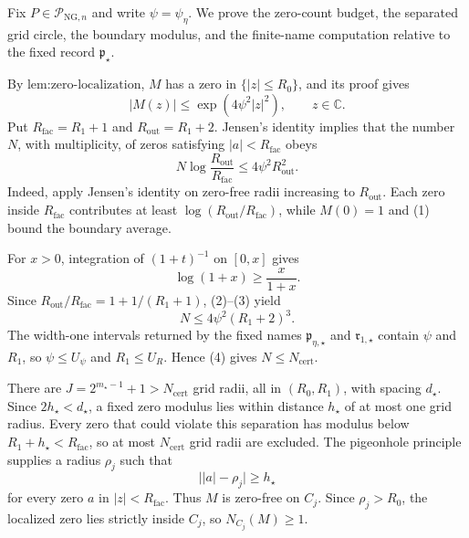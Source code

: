 Fix \(P\in\mathcal P_{\mathrm{NG},n}\) and write \(\psi=\psi_{\eta}\).  We prove the zero-count budget, the separated grid circle, the boundary modulus, and the finite-name computation relative to the fixed record \(\mathfrak p_{\star}\).

By \(\text{lem:zero-localization}\), \(M\) has a zero in \(\{|z|\le R_0\}\), and its proof gives
\[
 |M(z)|\le \exp(4\psi^2|z|^2),\qquad z\in\mathbb C. \tag{1}
\]
Put \(R_{\mathrm{fac}}=R_1+1\) and \(R_{\mathrm{out}}=R_1+2\).  Jensen's identity implies that the number \(N\), with multiplicity, of zeros satisfying \(|a|<R_{\mathrm{fac}}\) obeys
\[
 N\log\frac{R_{\mathrm{out}}}{R_{\mathrm{fac}}}
 \le4\psi^2R_{\mathrm{out}}^2. \tag{2}
\]
Indeed, apply Jensen's identity on zero-free radii increasing to \(R_{\mathrm{out}}\).  Each zero inside \(R_{\mathrm{fac}}\) contributes at least \(\log(R_{\mathrm{out}}/R_{\mathrm{fac}})\), while \(M(0)=1\) and (1) bound the boundary average.

For \(x>0\), integration of \((1+t)^{-1}\) on \([0,x]\) gives
\[
 \log(1+x)\ge \frac{x}{1+x}. \tag{3}
\]
Since \(R_{\mathrm{out}}/R_{\mathrm{fac}}=1+1/(R_1+1)\), (2)--(3) yield
\[
 N\le4\psi^2(R_1+2)^3. \tag{4}
\]
The width-one intervals returned by the fixed names \(\mathfrak p_{\eta,\star}\) and \(\mathfrak r_{1,\star}\) contain \(\psi\) and \(R_1\), so \(\psi\le U_{\psi}\) and \(R_1\le U_R\).  Hence (4) gives \(N\le N_{\mathrm{cert}}\).

There are \(J=2^{m_{\star}-1}+1>N_{\mathrm{cert}}\) grid radii, all in \((R_0,R_1)\), with spacing \(d_{\star}\).  Since \(2h_{\star}<d_{\star}\), a fixed zero modulus lies within distance \(h_{\star}\) of at most one grid radius.  Every zero that could violate this separation has modulus below \(R_1+h_{\star}<R_{\mathrm{fac}}\), so at most \(N_{\mathrm{cert}}\) grid radii are excluded.  The pigeonhole principle supplies a radius \(\rho_j\) such that
\[
 \bigl||a|-\rho_j\bigr|\ge h_{\star} \tag{5}
\]
for every zero \(a\) in \(|z|<R_{\mathrm{fac}}\).  Thus \(M\) is zero-free on \(C_j\).  Since \(\rho_j>R_0\), the localized zero lies strictly inside \(C_j\), so \(N_{C_j}(M)\ge1\).

